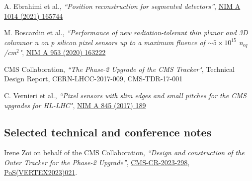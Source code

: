     \begin{refsection}
      \vspace{2mm}
      \onehalfspacing
A. Ebrahimi et al., {\sl ``Position reconstruction for segmented detectors''},  \href{https://www.sciencedirect.com/science/article/pii/S0168900221007294?via\%3Dihub}{NIM A 1014 (2021) 165744}

    \end{refsection}
    
    
     \begin{refsection}
      \vspace{2mm}
      \onehalfspacing
 M. Boscardin et al., {\em ``Performance of new radiation-tolerant thin planar and 3D columnar n on p silicon pixel sensors up to a maximum fluence of $\sim 5 \times 10^{15}$   n$_{eq}$/cm$^2$"}, \href{https://doi.org/10.1016/j.nima.2019.163222}{NIM A 953 (2020) 163222}
     \end{refsection}
     
     
             \begin{refsection}
      \vspace{2mm}
      \onehalfspacing
  CMS Collaboration, {\sl ``The Phase-2 Upgrade of the CMS Tracker"}, Technical Design Report, CERN-LHCC-2017-009, CMS-TDR-17-001
 \end{refsection}
 
         \begin{refsection}
      \vspace{2mm}
      \onehalfspacing

 C. Vernieri et al., {\sl ``Pixel sensors with slim edges and small pitches for the CMS upgrades for HL-LHC"}, \href{http://dx.doi.org/10.1016/j.nima.2016.06.020}{NIM A 845 (2017) 189}

 \end{refsection}

\subsection{Selected technical and conference notes}

\begin{refsection}
      \vspace{2mm}
      \onehalfspacing
Irene Zoi on behalf of the CMS Collaboration, {\sl ``Design and construction of the Outer Tracker for the Phase-2 Upgrade''},
\href{https://cds.cern.ch/record/2885850?ln=en}{CMS-CR-2023-298},
\href{https://doi.org/10.22323/1.448.0021}{PoS(VERTEX2023)021}.
    \end{refsection}

